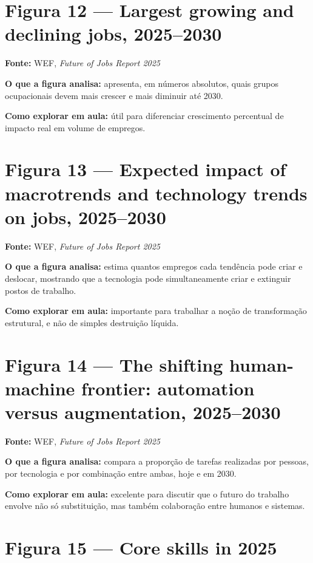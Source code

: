 \documentclass[
]{book}
\theoremstyle{definition}
\theoremstyle{definition}
\theoremstyle{definition}
\theoremstyle{definition}
\theoremstyle{remark}
\begin{document}
\section{Figura 12 --- Largest growing and declining jobs, 2025--2030}\label{figura-12-largest-growing-and-declining-jobs-20252030}

\textbf{Fonte:} WEF, \emph{Future of Jobs Report 2025}

\textbf{O que a figura analisa:} apresenta, em números absolutos, quais grupos ocupacionais devem mais crescer e mais diminuir até 2030.

\textbf{Como explorar em aula:} útil para diferenciar crescimento percentual de impacto real em volume de empregos.

\section{Figura 13 --- Expected impact of macrotrends and technology trends on jobs, 2025--2030}\label{figura-13-expected-impact-of-macrotrends-and-technology-trends-on-jobs-20252030}

\textbf{Fonte:} WEF, \emph{Future of Jobs Report 2025}

\textbf{O que a figura analisa:} estima quantos empregos cada tendência pode criar e deslocar, mostrando que a tecnologia pode simultaneamente criar e extinguir postos de trabalho.

\textbf{Como explorar em aula:} importante para trabalhar a noção de transformação estrutural, e não de simples destruição líquida.

\section{Figura 14 --- The shifting human-machine frontier: automation versus augmentation, 2025--2030}\label{figura-14-the-shifting-human-machine-frontier-automation-versus-augmentation-20252030}

\textbf{Fonte:} WEF, \emph{Future of Jobs Report 2025}

\textbf{O que a figura analisa:} compara a proporção de tarefas realizadas por pessoas, por tecnologia e por combinação entre ambas, hoje e em 2030.

\textbf{Como explorar em aula:} excelente para discutir que o futuro do trabalho envolve não só substituição, mas também colaboração entre humanos e sistemas.

\section{Figura 15 --- Core skills in 2025}\label{figura-15-core-skills-in-2025}
\end{document}
